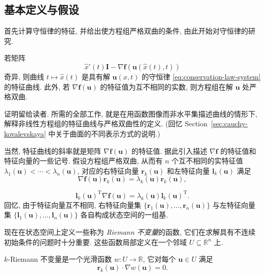 \subsection{基本定义与假设}\label{sec:conservation-basic-definitions}

首先计算守恒律的特征, 并给出使方程组严格双曲的条件, 由此开始对守恒律的研究.

\begin{Lemma}
\label{lem:conservation-characteristics}
若矩阵
\begin{equation}\label{eq:conservation-characteristic-matrix}
\hat x'(t)\bm{I}-\nabla\bm{f}(\bm{u}(\hat x(t),t))
\end{equation}
奇异, 则曲线 $t\mapsto\hat x(t)$ 是具有解 $\bm{u}(x,t)$ 的守恒律 \eqref{eq:conservation-law-system} 的特征曲线. 此外, 若 $\nabla\bm{f}(\bm{u})$ 的特征值为互不相同的实数, 则方程组在解 $\bm{u}$ 处严格双曲.
\end{Lemma}

证明留给读者. 所需的全部工作, 就是在用函数图像而非水平集描述曲线的情形下, 解释非线性方程组的特征曲线与严格双曲性的定义. (回忆 Section~\ref{sec:cauchy-kovalevskaya} 中关于曲面的不同表示方式的说明.)

当然, 特征曲线的斜率就是矩阵 $\nabla\bm{f}(\bm{u})$ 的特征值. 据此引入描述 $\nabla\bm{f}$ 的特征值和特征向量的一些记号. 假设方程组严格双曲, 从而有 $n$ 个互不相同的实特征值 $\lambda_1(\bm{u})<\cdots<\lambda_n(\bm{u})$, 对应的右特征向量 $\bm{r}_k(\bm{u})$ 和左特征向量 $\bm{l}_k(\bm{u})$ 满足
\begin{equation}\label{eq:conservation-right-eigenvectors}
\nabla\bm{f}(\bm{u})\bm{r}_k(\bm{u})=\lambda_k(\bm{u})\bm{r}_k(\bm{u}),
\end{equation}

\begin{equation}\label{eq:conservation-left-eigenvectors}
\bm{l}_k(\bm{u})^\mathrm{T}\nabla\bm{f}(\bm{u})=\lambda_k(\bm{u})\bm{l}_k(\bm{u})^\mathrm{T}.
\end{equation}
回忆, 由于特征向量互不相同, 右特征向量集 $\{\bm{r}_1(\bm{u}),\allowbreak \ldots,\bm{r}_n(\bm{u})\}$ 与左特征向量集 $\{\bm{l}_1(\bm{u}),\allowbreak \ldots,\bm{l}_n(\bm{u})\}$ 各自构成状态空间的一组基.

现在在状态空间上定义一些称为 \emph{Riemann 不变量}的函数, 它们在求解具有不连续初始条件的问题时十分重要. 这些函数局部定义在一个邻域 $U\subseteq\mathbb{R}^n$ 上.

\begin{Definition}
\label{def:riemann-invariant}
$k$-Riemann 不变量是一个光滑函数 $w:U\to\mathbb{R}$, 它对每个 $\bm{u}\in U$ 满足
\begin{equation}\label{eq:riemann-invariant-definition}
\bm{r}_k(\bm{u})\cdot\nabla w(\bm{u})=0.
\end{equation}

\end{Definition}

